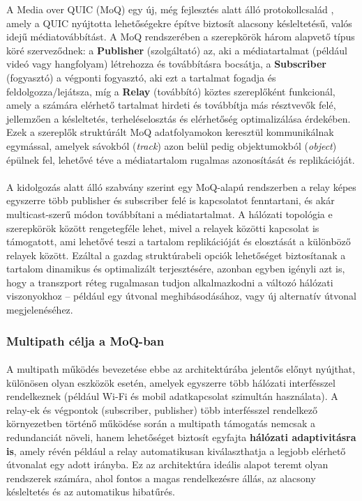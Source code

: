 \documentclass[a4paper,oneside]{article}
\begin{document}
A Media over QUIC (MoQ) egy új, még fejlesztés alatt álló protokollcsalád \cite{moq_draft}, 
amely a QUIC nyújtotta lehetőségekre építve biztosít alacsony késleltetésű, 
valós idejű médiatovábbítást. A MoQ rendszerében a szerepkörök három alapvető 
típus köré szerveződnek: a \textbf{Publisher} (szolgáltató) az, aki a médiatartalmat (például 
videó vagy hangfolyam) létrehozza és továbbításra bocsátja, a \textbf{Subscriber} (fogyasztó)
a végponti fogyasztó, aki ezt a tartalmat fogadja és feldolgozza/lejátsza, míg a \textbf{Relay} (továbbító)
köztes szereplőként funkcionál, amely a számára elérhető tartalmat hirdeti és 
továbbítja más résztvevők felé, jellemzően a késleltetés, terheléselosztás 
és elérhetőség optimalizálása érdekében. 
Ezek a szereplők struktúrált MoQ adatfolyamokon keresztül kommunikálnak egymással, amelyek sávokból
(\emph{track}) azon belül pedig objektumokból (\emph{object}) épülnek 
fel, lehetővé téve a médiatartalom rugalmas azonosítását és replikációját.

\paragraph{}
A kidolgozás alatt álló szabvány szerint egy MoQ-alapú rendszerben a relay képes 
egyszerre több publisher és subscriber felé is kapcsolatot fenntartani, 
és akár multicast-szerű módon továbbítani a médiatartalmat. 
A hálózati topológia e szerepkörök között rengetegféle lehet, mivel 
a relayek közötti kapcsolat is támogatott, ami lehetővé teszi
a tartalom replikációját és elosztását a különböző relayek között. 
Ezáltal a gazdag struktúrabeli opciók lehetőséget biztosítanak a tartalom dinamikus 
és optimalizált terjesztésére, azonban egyben igényli azt is, hogy a transzport 
réteg rugalmasan tudjon alkalmazkodni a változó hálózati viszonyokhoz – például 
egy útvonal meghibásodásához, vagy új alternatív útvonal megjelenéséhez.

\subsubsection{Multipath célja a MoQ-ban}
\paragraph{}
A multipath működés bevezetése ebbe az architektúrába jelentős előnyt nyújthat, 
különösen olyan eszközök esetén, amelyek egyszerre több hálózati interfésszel 
rendelkeznek (például Wi-Fi és mobil adatkapcsolat szimultán használata). A relay-ek és végpontok 
(subscriber, publisher) több interfésszel rendelkező környezetben 
történő működése során a multipath támogatás nemcsak a redundanciát növeli, hanem 
lehetőséget biztosít egyfajta \textbf{hálózati adaptivitásra is}, amely révén például 
a relay automatikusan kiválaszthatja a legjobb elérhető útvonalat egy adott irányba. 
Ez az architektúra ideális alapot teremt olyan rendszerek számára, ahol fontos a magas 
rendelkezésre állás, az alacsony késleltetés és az automatikus hibatűrés.
\end{document}
